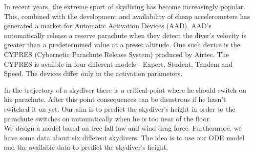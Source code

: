 
In recent years, the extreme sport of skydiving has become increasingly popular. This, combined with the development 
and availability of cheap accelerometers has generated a market for Automatic Activation Devices (AAD). AAD's 
automatically release a reserve parachute when they detect the diver's velocity is greater than a predetermined
value at a preset altitude. One such device is the CYPRES (Cybernetic Parachute Release System) produced by Airtec.
The CYPRES is availble in four different models -  Expert, Student, Tandem and Speed. The devices differ only in the 
activation parameters.

In the trajectory of a skydiver there is a critical point where he should switch on his parachute. 
After this point consequences can be disastrous if he hasn't switched it on yet. 
Our aim is to predict the skydiver's height in order to the parachute switches on automatically when he is too near of 
the floor.\\
We design a model based on free fall law and wind drag force. 
Furthermore, we have some data about six different skydivers. 
The idea is to use our ODE model and the available data to predict the skydiver's height. 
